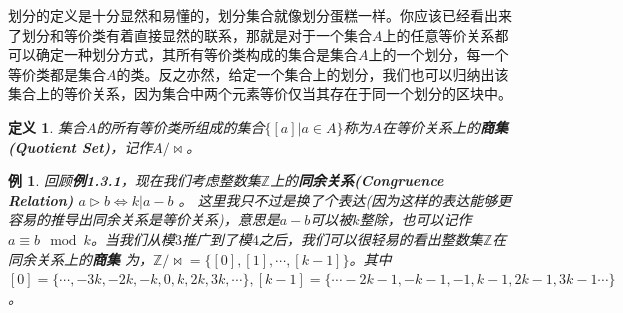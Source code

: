 \documentclass[mathserif,hyperref,UTF8,openany,b5paper]{ctexbook}
\newtheorem{exmp}{例}[section]
\newtheorem{defn}{定义}[section]
\begin{document}
划分的定义是十分显然和易懂的，划分集合就像划分蛋糕一样。你应该已经看出来了划分和等价类有着直接显然的联系，那就是对于一个集合$A$上的任意等价关系都可以确定一种划分方式，其所有等价类构成的集合是集合$A$上的一个划分，每一个等价类都是集合$A$的类。反之亦然，给定一个集合上的划分，我们也可以归纳出该集合上的等价关系，因为集合中两个元素等价仅当其存在于同一个划分的区块中。
\begin{defn}
集合$A$的所有等价类所组成的集合$\{[a]|a\in A\}$称为$A$在等价关系上的\textbf{商集(Quotient Set)}，记作$A/\bowtie$。
\end{defn}
\begin{exmp}
回顾\textbf{例1.3.1}，现在我们考虑整数集$\mathbb{Z}$上的\textbf{同余关系(Congruence Relation)} $a\vartriangleright b \iff k|a-b$ 。
这里我只不过是换了个表达(因为这样的表达能够更容易的推导出同余关系是等价关系)，意思是$a-b$可以被$k$整除，也可以记作$a \equiv b \mod{k} $。当我们从模$3$推广到了模$4$之后，我们可以很轻易的看出整数集$\mathbb{Z}$在同余关系上的\textbf{商集 }为，$\mathbb{Z}/\bowtie = \{[0],[1],\cdots,[k-1]\}$。其中$[0]=\{\cdots,-3k,-2k,-k,0,k,2k,3k,\cdots\}, [k-1] = \{\cdots-2k-1,-k-1,-1,k-1,2k-1,3k-1 \cdots\}$。
\end{exmp}
\end{document}

